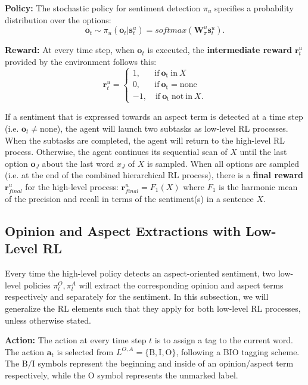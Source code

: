 \documentclass[sigconf]{acmart}
\begin{document}
\textbf{Policy:}
The stochastic policy for sentiment detection $\pi_u$ specifies a probability distribution over the options:
\begin{equation}
\mathrm{\textbf{o}}_t \sim \pi_u (\mathrm{\textbf{o}}_t|\mathrm{\textbf{s}}_t^u) = softmax(\mathrm{\textbf{W}}_{\pi}^{u}\mathrm{\textbf{s}}_t^u).
\end{equation}

\textbf{Reward:}
At every time step, when $\mathrm{\textbf{o}}_t$ is executed, the \textbf{intermediate reward} $\mathrm{\textbf{r}}_t^u$ provided by the environment follows this:
{\small
\begin{equation}
\mathrm{\textbf{r}}_{t}^u =
\begin{cases}
1,\quad\ \ \ \mathrm{if\ \textbf{o}_t\ in}\ X \\
0,\quad\ \ \ \mathrm{if\ \textbf{o}_t} = \mathrm{none} \\
-1,\quad\mathrm{if\ \textbf{o}_t\ not\ in}\ X.
\end{cases}
\end{equation}
}

If a sentiment that is expressed towards an aspect term is detected at a time step (i.e. $\mathrm{\textbf{o}}_t \neq \mathrm{none}$), the agent will launch two subtasks as low-level RL processes. When the subtasks are completed, the agent will return to the high-level RL process. Otherwise, the agent continues its sequential scan of $X$ until the last option $\mathrm{\textbf{o}}_J$ about the last word $x_J$ of $X$ is sampled. When all options are sampled (i.e. at the end of the combined hierarchical RL process), there is a \textbf{final reward} $\mathrm{\textbf{r}}^u_{final}$ for the high-level process: $\mathrm{\textbf{r}}^u_{final} = F_1(X)$
where $F_1$ is the harmonic mean of the precision and recall in terms of the sentiment(s) in a sentence $X$.


\subsection{Opinion and Aspect Extractions with Low-Level RL}
Every time the high-level policy detects an aspect-oriented sentiment, two low-level policies $\pi_l^O,\pi_l^A$ will extract the corresponding opinion and aspect terms respectively and separately for the sentiment. In this subsection, we will generalize the RL elements such that they apply for both low-level RL processes, unless otherwise stated.

\textbf{Action:}
The action at every time step $t$ is to assign a tag to the current word. The action $\mathrm{\textbf{a}}_t$ is selected from $L^{O,A} = \{\mathrm{B,I,O}\}$, following a BIO tagging scheme. The $\mathrm{B/I}$ symbols represent the beginning and inside of an opinion/aspect term respectively, while the $\mathrm{O}$ symbol represents the unmarked label.
\end{document}
